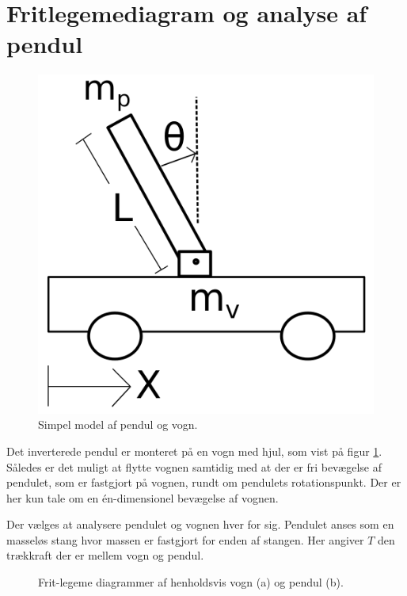 \section{Fritlegemediagram og analyse af pendul}\label{sec:sec_fritlegemediagram}

\begin{figure}
	\centering
	\includegraphics[width=.3\textwidth]{billeder/pendul_vogn.png}
	\caption{Simpel model af pendul og vogn.}
	\label{fig:pendul_vogn}
\end{figure}
\FloatBlock

Det inverterede pendul er monteret på en vogn med hjul, som vist på figur \ref{fig:pendul_vogn}.
Således er det muligt at flytte vognen samtidig med at der er fri bevægelse af pendulet, som er fastgjort på vognen, rundt om pendulets rotationspunkt.
Der er her kun tale om en én-dimensionel bevægelse af vognen.

Der vælges at analysere pendulet og vognen hver for sig.
Pendulet anses som en masseløs stang hvor massen er fastgjort for enden af stangen. 
Her angiver $T$ den trækkraft der er mellem vogn og pendul.
\begin{figure}
	\centering
	\caption[Frit-legeme digrammer af vogn og pendul]{Frit-legeme diagrammer af henholdsvis vogn (a) og pendul (b).}
	\label{fig:fridiagrammer}
\end{figure}

